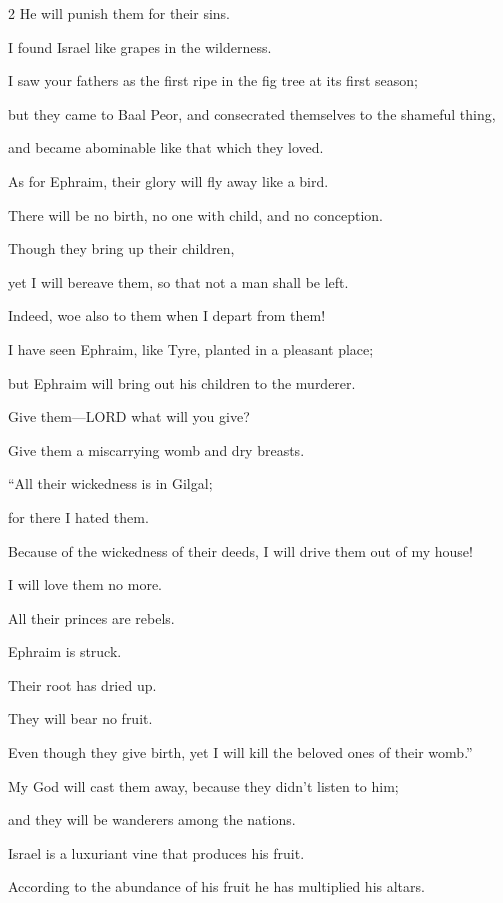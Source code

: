 \begin{multicols}{2}
He will punish them for their sins.

\myverse{}I found Israel like grapes in the wilderness.

I saw your fathers as the first ripe in the fig tree at its first season;

but they came to Baal Peor, and consecrated themselves to the shameful thing,

and became abominable like that which they loved.

\myverse{}As for Ephraim, their glory will fly away like a bird.

There will be no birth, no one with child, and no conception.

\myverse{}Though they bring up their children,

yet I will bereave them, so that not a man shall be left.

Indeed, woe also to them when I depart from them!

\myverse{}I have seen Ephraim, like Tyre, planted in a pleasant place;

but Ephraim will bring out his children to the murderer.

\myverse{}Give them—LORD what will you give?

Give them a miscarrying womb and dry breasts.


\vspace{\baselineskip} \myverse{}“All their wickedness is in Gilgal;

for there I hated them.

Because of the wickedness of their deeds, I will drive them out of my house!

I will love them no more.

All their princes are rebels.

\myverse{}Ephraim is struck.

Their root has dried up.

They will bear no fruit.

Even though they give birth, yet I will kill the beloved ones of their womb.”


\vspace{\baselineskip} \myverse{}My God will cast them away, because they didn’t listen to him;

and they will be wanderers among the nations.


\mychapter{} \myverse*{}Israel is a luxuriant vine that produces his fruit.

\quad\quad According to the abundance of his fruit he has multiplied his altars.


\end{multicols}
